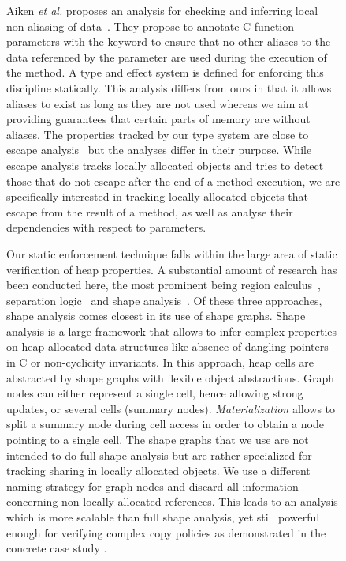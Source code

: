 \documentclass{LMCS}
\newcommand{\ttt}[1]{}
\begin{document}
\begin{figure}
Aiken \emph{et al.} proposes an analysis for checking and inferring
local non-aliasing of data~\cite{Aiken:03}. They propose to annotate C function parameters with
the keyword \ttt{restrict} to ensure that no other aliases to the data
referenced by the parameter are used during the execution of the
method. A type and effect system is defined for enforcing this
discipline statically. This analysis differs from ours in that it
allows aliases to exist as long as they are not used whereas we aim at
providing guarantees that certain parts of memory are without
aliases. 
The properties tracked by our type system are close to 
escape analysis~\cite{Blanchet99,ChoiGSSM99} but the analyses differ
in their purpose. While escape
analysis tracks locally allocated objects and tries to detect those
that do not escape after the end of a method execution, we are
specifically interested in tracking 
locally allocated objects that escape from the result of a method, as
well as analyse their dependencies with respect to parameters.





Our static enforcement technique falls within the large area of static
verification of heap properties. A substantial amount of research has been
conducted here, the most prominent being region calculus~\cite{TofteTalpin97},
separation logic~\cite{OHearnYR04} and shape analysis~\cite{SagivRW02}. Of
these three approaches, shape analysis comes closest in its use of shape
graphs.  Shape analysis is a large framework that allows to infer complex
properties on heap allocated data-structures like absence of dangling pointers
in C or non-cyclicity invariants. In this approach, heap cells are abstracted
by shape graphs with flexible object abstractions. Graph nodes can either
represent a single cell, hence allowing strong updates, or several cells
(summary nodes). \emph{Materialization} allows to split a summary node during
cell access in order to obtain a node pointing to a single cell.
The shape graphs that we use are not intended to do full shape analysis but
are rather specialized for tracking sharing in locally allocated objects. We
use a different naming strategy for graph nodes and discard all information
concerning non-locally allocated references. This leads to an analysis which
is more scalable than full shape analysis, yet still powerful enough
for verifying complex copy policies as demonstrated in the concrete case study
\ttt{java.util.LinkedList}.


\end{figure}
\end{document}
